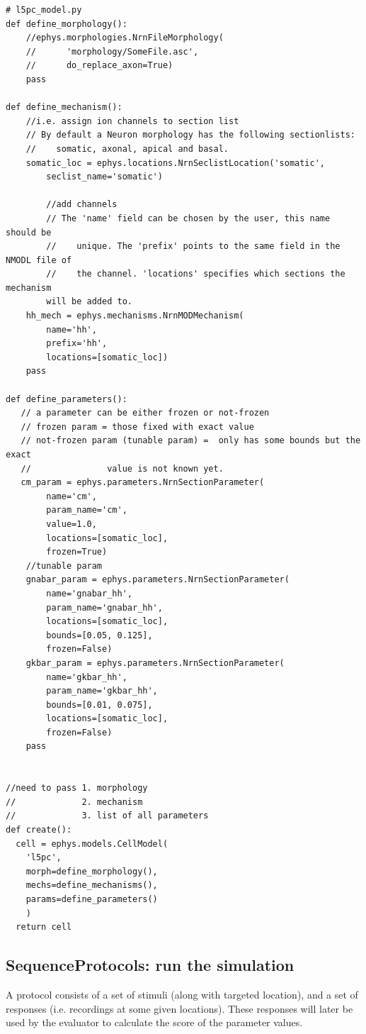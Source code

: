 \begin{lstlisting}
# l5pc_model.py
def define_morphology():
	//ephys.morphologies.NrnFileMorphology(
	//      'morphology/SomeFile.asc',
	//      do_replace_axon=True)
	pass

def define_mechanism():
    //i.e. assign ion channels to section list
    // By default a Neuron morphology has the following sectionlists:
    //    somatic, axonal, apical and basal.
    somatic_loc = ephys.locations.NrnSeclistLocation('somatic',
      	seclist_name='somatic')

      	//add channels
      	// The 'name' field can be chosen by the user, this name should be
      	//    unique. The 'prefix' points to the same field in the NMODL file of
      	//    the channel. 'locations' specifies which sections the mechanism
      	will be added to.
    hh_mech = ephys.mechanisms.NrnMODMechanism(
        name='hh',
        prefix='hh',
        locations=[somatic_loc])
    pass

def define_parameters():
   // a parameter can be either frozen or not-frozen
   // frozen param = those fixed with exact value
   // not-frozen param (tunable param) =  only has some bounds but the exact
   //               value is not known yet.
   cm_param = ephys.parameters.NrnSectionParameter(
        name='cm',
        param_name='cm',
        value=1.0,
        locations=[somatic_loc],
        frozen=True)
	//tunable param
	gnabar_param = ephys.parameters.NrnSectionParameter(
        name='gnabar_hh',
        param_name='gnabar_hh',
        locations=[somatic_loc],
        bounds=[0.05, 0.125],
        frozen=False)
    gkbar_param = ephys.parameters.NrnSectionParameter(
        name='gkbar_hh',
        param_name='gkbar_hh',
        bounds=[0.01, 0.075],
        locations=[somatic_loc],
        frozen=False)
	pass


//need to pass 1. morphology
//             2. mechanism
//             3. list of all parameters
def create():
  cell = ephys.models.CellModel(
	'l5pc',
	morph=define_morphology(),
	mechs=define_mechanisms(),
	params=define_parameters()
	)
  return cell
\end{lstlisting}


\subsection{SequenceProtocols: run the simulation}
\label{sec:protocol}

A protocol consists of a set of stimuli (along with targeted location), and a
set of responses (i.e. recordings at some given locations). These responses will
later be used by the evaluator to calculate the score of the parameter values.



